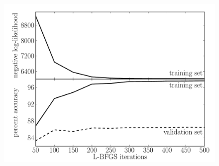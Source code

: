 \documentclass[11pt]{article}
\newcommand{\figlabel}[1]{\label{fig:#1}}
\begin{document}
\begin{figure}[htbp]
\begin{center}
    \includegraphics[width=\textwidth]{full_500_convergence.pdf}
\end{center}
\caption{%
\figlabel{full500}}
\end{figure}
\end{document}
